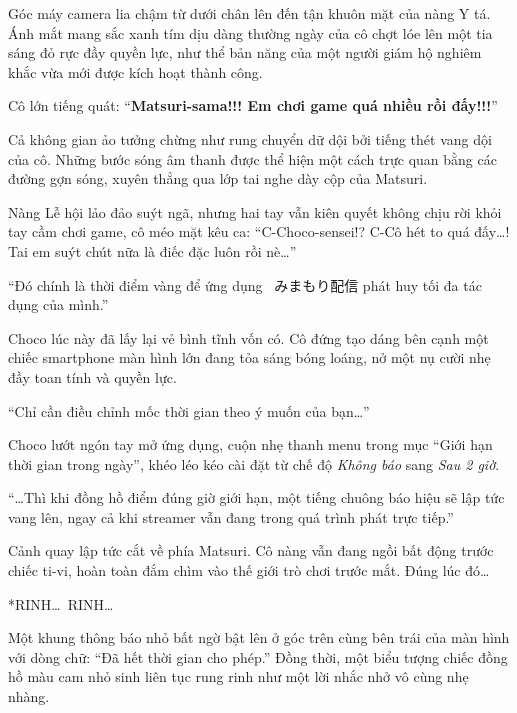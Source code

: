 \documentclass[../main.tex]{subfiles}
\begin{document}
Góc máy camera lia chậm từ dưới chân lên đến tận khuôn mặt của nàng Y tá. Ánh mắt mang sắc xanh tím dịu dàng thường ngày của cô chợt lóe lên một tia sáng đỏ rực đầy quyền lực, như thể bản năng của một người giám hộ nghiêm khắc vừa mới được kích hoạt thành công.

Cô lớn tiếng quát: ``\textbf{Matsuri-sama!!! Em chơi game quá nhiều rồi đấy!!!}''


Cả không gian ảo tưởng chừng như rung chuyển dữ dội bởi tiếng thét vang dội của cô. Những bước sóng âm thanh được thể hiện một cách trực quan bằng các đường gợn sóng, xuyên thẳng qua lớp tai nghe dày cộp của Matsuri.

Nàng Lễ hội lảo đảo suýt ngã, nhưng hai tay vẫn kiên quyết không chịu rời khỏi tay cầm chơi game, cô méo mặt kêu ca: ``C-Choco-sensei!? C-Cô hét to quá đấy\dots! Tai em suýt chút nữa là điếc đặc luôn rồi nè\dots''

\begin{center}
  ``Đó chính là thời điểm vàng để ứng dụng \hll\ みまもり配信 phát huy tối đa tác dụng của mình.''
\end{center}

Choco lúc này đã lấy lại vẻ bình tĩnh vốn có. Cô đứng tạo dáng bên cạnh một chiếc smartphone màn hình lớn đang tỏa sáng bóng loáng, nở một nụ cười nhẹ đầy toan tính và quyền lực.

\begin{center}
  ``Chỉ cần điều chỉnh mốc thời gian theo ý muốn của bạn\dots''
\end{center}

Choco lướt ngón tay mở ứng dụng, cuộn nhẹ thanh menu trong mục ``Giới hạn thời gian trong ngày'', khéo léo kéo cài đặt từ chế độ \emph{Không báo} sang \emph{Sau 2 giờ}.

\begin{center}
  ``\dots Thì khi đồng hồ điểm đúng giờ giới hạn, một tiếng chuông báo hiệu sẽ lập tức vang lên, ngay cả khi streamer vẫn đang trong quá trình phát trực tiếp.''
\end{center}

Cảnh quay lập tức cắt về phía Matsuri. Cô nàng vẫn đang ngồi bất động trước chiếc ti-vi, hoàn toàn đắm chìm vào thế giới trò chơi trước mắt. Đúng lúc đó\dots

*RINH\dots\ RINH\dots*

Một khung thông báo nhỏ bất ngờ bật lên ở góc trên cùng bên trái của màn hình với dòng chữ: ``Đã hết thời gian cho phép.'' Đồng thời, một biểu tượng chiếc đồng hồ màu cam nhỏ sinh liên tục rung rinh như một lời nhắc nhở vô cùng nhẹ nhàng.
\end{document}
